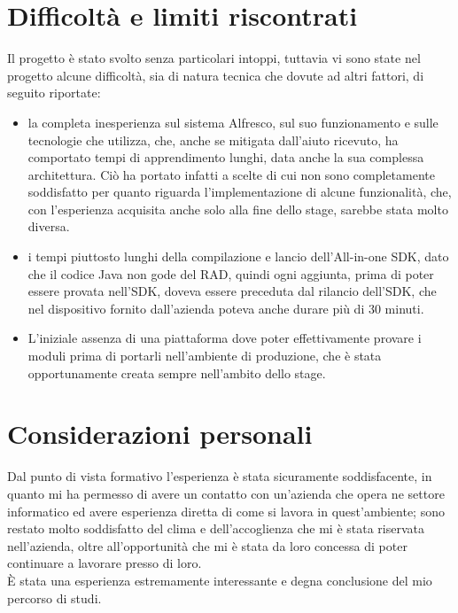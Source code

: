 \section{Difficoltà e limiti riscontrati}
Il progetto è stato svolto senza particolari intoppi, tuttavia vi sono state nel progetto alcune difficoltà, sia di natura tecnica che dovute ad altri fattori, di seguito riportate:
\begin{itemize}
\item la completa inesperienza sul sistema Alfresco, sul suo funzionamento e sulle tecnologie che utilizza, che, anche se mitigata dall'aiuto ricevuto, ha comportato tempi di apprendimento lunghi, data anche la sua complessa architettura.
Ciò ha portato infatti a scelte di cui non sono completamente soddisfatto per quanto riguarda l'implementazione di alcune funzionalità, che, con l'esperienza acquisita anche solo alla fine dello stage, sarebbe stata molto diversa.
\item i tempi piuttosto lunghi della compilazione e lancio dell'All-in-one SDK, dato che il codice Java non gode del RAD, quindi ogni aggiunta, prima di poter essere provata nell'SDK, doveva essere preceduta dal rilancio dell'SDK, che nel dispositivo fornito dall'azienda poteva anche durare più di 30 minuti.
\item L'iniziale assenza di una piattaforma dove poter effettivamente provare i moduli prima di portarli nell'ambiente di produzione, che è stata opportunamente creata sempre nell'ambito dello stage.
\end{itemize}
\section{Considerazioni personali}
Dal punto di vista formativo l'esperienza è stata sicuramente soddisfacente, in quanto mi ha permesso di avere un contatto con un'azienda che opera ne settore informatico ed avere esperienza diretta di come si lavora in quest'ambiente; sono restato molto soddisfatto del clima e dell'accoglienza che mi è stata riservata nell'azienda, oltre all'opportunità che mi è stata da loro concessa di poter continuare a lavorare presso di loro.\\
È stata una esperienza estremamente interessante e degna conclusione del mio percorso di studi.